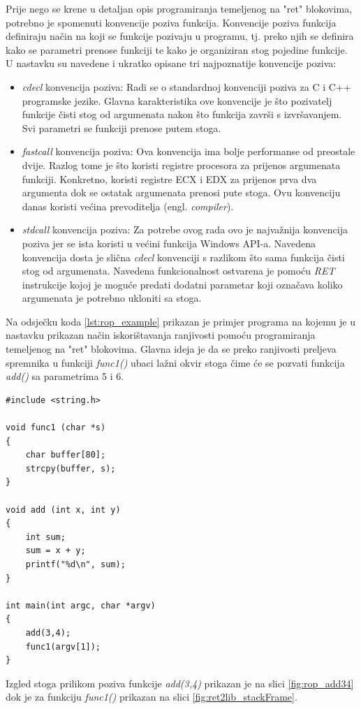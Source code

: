 \documentclass[times, utf8, diplomski, numeric]{fer}
\begin{document}
Prije nego se krene u detaljan opis programiranja temeljenog na "ret" blokovima, potrebno  je spomenuti konvencije poziva funkcija. Konvencije poziva funkcija definiraju način na koji se funkcije pozivaju u programu, tj. preko njih se definira kako se parametri prenose funkciji te kako je organiziran stog pojedine funkcije. U nastavku su navedene i ukratko opisane tri najpoznatije konvencije poziva:
\begin{itemize}
\item \emph{cdecl} konvencija poziva: Radi se o standardnoj konvenciji poziva za C i C++ programske jezike. Glavna karakteristika ove konvencije je što pozivatelj funkcije čisti stog od argumenata nakon što funkcija završi s izvršavanjem. Svi parametri se funkciji prenose putem stoga.
\item \emph{fastcall} konvencija poziva: Ova konvencija ima bolje performanse od preostale dvije. Razlog tome je što koristi registre procesora za prijenos argumenata funkciji. Konkretno, koristi registre ECX i EDX za prijenos prva dva argumenta dok se ostatak argumenata prenosi pute stoga. Ovu konvenciju danas koristi većina prevoditelja (engl. \emph{compiler}).
\item \emph{stdcall} konvencija poziva: Za potrebe ovog rada ovo je najvažnija konvencija poziva jer se ista koristi u većini funkcija Windows API-a. Navedena konvencija dosta je slična \emph{cdecl} konvenciji s razlikom što sama funkcija čisti stog od argumenata. Navedena funkcionalnost ostvarena je pomoću \emph{RET} instrukcije kojoj je moguće predati dodatni parametar koji označava koliko argumenata je potrebno ukloniti sa stoga.
\end{itemize}
Na odsječku koda \ref{lst:rop_example} prikazan je primjer programa na kojemu je u nastavku prikazan način iskorištavanja ranjivosti pomoću programiranja temeljenog na "ret" blokovima. Glavna ideja je da se preko ranjivosti preljeva spremnika u funkciji \emph{func1()} ubaci lažni okvir stoga čime će se pozvati funkcija \emph{add()} sa parametrima 5 i 6.
 
\begin{lstlisting}[frame=single, caption=Primjera programa za programiranje "ret" blokovima, label={lst:rop_example}]
#include <string.h>
 
void func1 (char *s)
{
	char buffer[80];
	strcpy(buffer, s);
}

void add (int x, int y)
{
	int sum;
	sum = x + y;
	printf("%d\n", sum);
}

int main(int argc, char *argv)
{
	add(3,4);
	func1(argv[1]);
}
\end{lstlisting}
Izgled stoga prilikom poziva funkcije \emph{add(3,4)} prikazan je na slici \ref{fig:rop_add34} dok je za funkciju \emph{func1()} prikazan na slici \ref{fig:ret2lib_stackFrame}.
\end{document}
